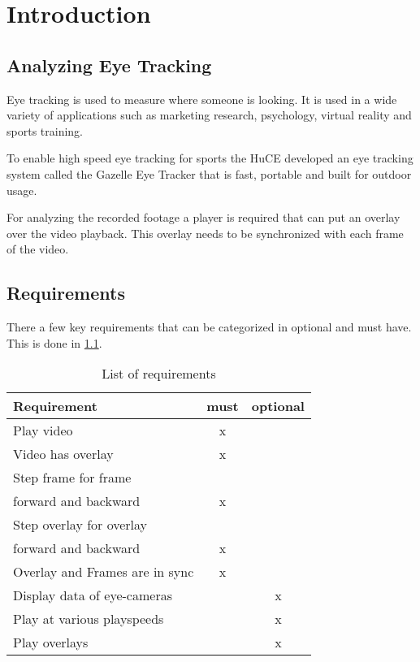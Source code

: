 \chapter{Introduction}
\label{chap:introduction}



\nocite{kopka:band1}
\nocite{raichle:bibtex_programmierung}
\nocite{MiKTeX}
\nocite{KOMA}
\nocite{TeXnicCenter}
\nocite{Marti06}
\nocite{Erbsland08}
\nocite{juergens:einfuehrung}
\nocite{juergens:fortgeschritten}

\section{Analyzing Eye Tracking}
\label{sec:einleitung_aufbau}
Eye tracking is used to measure where someone is looking. It is used in a wide variety of applications such as marketing research, psychology, virtual reality and sports training. 

To enable high speed eye tracking for sports the HuCE developed an eye tracking system called the Gazelle Eye Tracker that is fast, portable and built for outdoor usage.   

For analyzing the recorded footage a player is required that can put an overlay over the video playback. This overlay needs to be synchronized with each frame of the video.



\section{Requirements}
\label{sec:introduction_contact}

There a few key requirements that can be categorized in optional and must have. This is done in \ref{tab:requirements}. 

\begin{table}[H]
	\centering
	\begin{tabular}{lcc} \toprule
		\textbf{Requirement} & \textbf{must} & \textbf{optional} \\ \midrule
		Play video & x &  \\ \midrule
		Video has overlay & x &  \\ \midrule
		Step frame for frame \\ forward and backward& x &  \\ \midrule
		Step overlay for overlay \\ forward and backward& x &  \\ \midrule
		Overlay and Frames are in sync & x &  \\ \midrule
		Display data of eye-cameras &  & x \\ \midrule
		Play at various playspeeds &  & x \\ \midrule
		Play overlays &  & x \\ \midrule
	\end{tabular}
	\caption{List of requirements }
	\label{tab:requirements}
\end{table}

